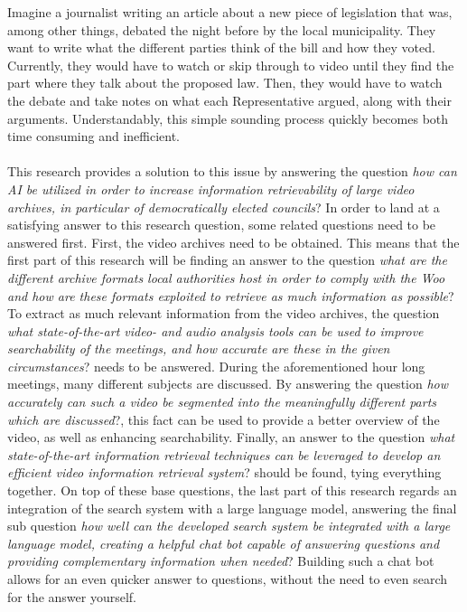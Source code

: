 \documentclass[twoside]{uva-inf-bachelor-thesis}
\begin{document}
Imagine a journalist writing an article about a new piece of legislation that was, among other things, debated the night before by the local municipality. They want to write what the different parties think of the bill and how they voted. Currently, they would have to watch or skip through to video until they find the part where they talk about the proposed law. Then, they would have to watch the debate and take notes on what each Representative argued, along with their arguments.  Understandably, this simple sounding process quickly becomes both time consuming and inefficient. 
\\ \\
This research provides a solution to this issue by answering the question \textit{how can AI be utilized in order to increase information retrievability of large video archives, in particular of democratically elected councils}? In order to land at a satisfying answer to this research question, some related questions need to be answered first. 
First, the video archives need to be obtained. This means that the first part of this research will be finding an answer to the question \textit{what are the different archive formats local authorities host in order to comply with the Woo and how are these formats exploited to retrieve as much information as possible}?
To extract as much relevant information from the video archives, the question \textit{what state-of-the-art video- and audio analysis tools can be used to improve searchability of the meetings, and how accurate are these in the given circumstances}? needs to be answered. During the aforementioned hour long meetings, many different subjects are discussed. By answering the question \textit{how accurately can such a video be segmented into the meaningfully different parts which are discussed}?, this fact can be used to provide a better overview of the video, as well as enhancing searchability. Finally, an answer to the question \textit{what state-of-the-art information retrieval techniques can be leveraged to develop an efficient video information retrieval system}? should be found, tying everything together.
On top of these base questions, the last part of this research regards an integration of the search system with a large language model, answering the final sub question \textit{how well can the developed search system be integrated with a large language model, creating a helpful chat bot capable of answering questions and providing complementary information when needed}? Building such a chat bot allows for an even quicker answer to questions, without the need to even search for the answer yourself.
\end{document}
